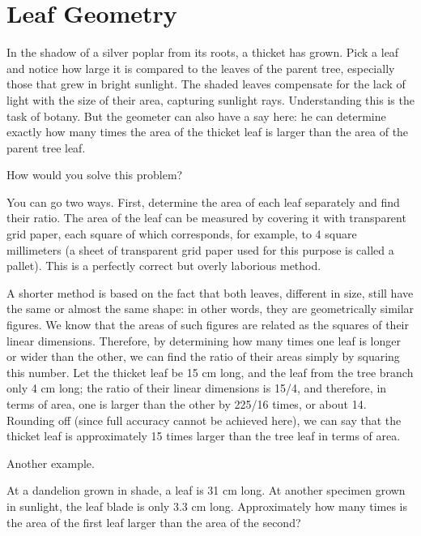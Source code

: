 \section{Leaf Geometry}
\label{sec-1.12}

\ques In the shadow of a silver poplar from its roots, a thicket has grown. Pick a leaf and notice how large it is compared to the leaves of the parent tree, especially those that grew in bright sunlight. The shaded leaves compensate for the lack of light with the size of their area, capturing sunlight rays. Understanding this is the task of botany. But the geometer can also have a say here: he can determine exactly how many times the area of the thicket leaf is larger than the area of the parent tree leaf.

How would you solve this problem?


\ans You can go two ways. First, determine the area of each leaf separately and find their ratio. The area of the leaf can be measured by covering it with transparent grid paper, each square of which corresponds, for example, to 4 square millimeters (a sheet of transparent grid paper used for this purpose is called a pallet). This is a perfectly correct but overly laborious method.

A shorter method is based on the fact that both leaves, different in size, still have the same or almost the same shape: in other words, they are geometrically similar figures. We know that the areas of such figures are related as the squares of their linear dimensions. Therefore, by determining how many times one leaf is longer or wider than the other, we can find the ratio of their areas simply by squaring this number. Let the thicket leaf be 15 cm long, and the leaf from the tree branch only 4 cm long; the ratio of their linear dimensions is 15/4, and therefore, in terms of area, one is larger than the other by 225/16 times, or about 14. Rounding off (since full accuracy cannot be achieved here), we can say that the thicket leaf is approximately 15 times larger than the tree leaf in terms of area.

Another example.

\ques At a dandelion grown in shade, a leaf is 31 cm long. At another specimen grown in sunlight, the leaf blade is only 3.3 cm long. Approximately how many times is the area of the first leaf larger than the area of the second?



